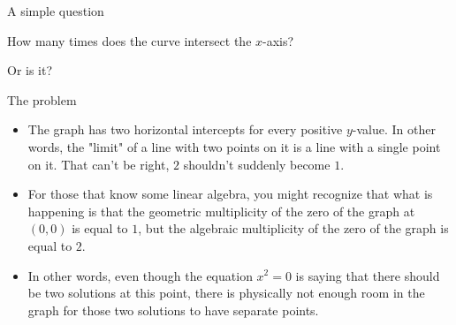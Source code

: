 \documentclass[aspectratio=169,10pt]{beamer}
\begin{document}
\begin{frame}{A simple question}
  \centering

  \vspace{1em}
  How many times does the curve intersect the $x$-axis?

  \pause
  \vspace{0.5em}
\end{frame}

\begin{frame}[c]
  \begin{center}
    {Or is it?}
  \end{center}
\end{frame}

\begin{frame}{The problem}
    \begin{itemize}
        \item The graph has two horizontal intercepts for every positive $y$-value. In other words, the "limit" of a line with two points on it is a line with a single point on it. That can't be right, $2$ shouldn't suddenly become $1$.
        \pause\item For those that know some linear algebra, you might recognize that what is happening is that the geometric multiplicity of the zero of the graph at $(0,0)$ is equal to $1$, but the algebraic multiplicity of the zero of the graph is equal to $2$.
        \pause\item In other words, even though the equation $x^2=0$ is saying that there should be two solutions at this point, there is physically not enough room in the graph for those two solutions to have separate points.
    \end{itemize}
\end{frame}
\end{document}
